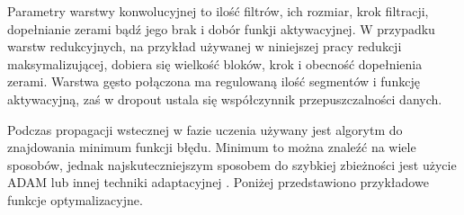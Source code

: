{\parindent0pt %
Parametry warstwy konwolucyjnej to ilość filtrów, ich rozmiar, krok filtracji, dopełnianie zerami bądź jego brak i dobór funkji aktywacyjnej. W przypadku warstw redukcyjnych, na przykład używanej w niniejszej pracy redukcji maksymalizującej, dobiera się wielkość bloków, krok i obecność dopełnienia zerami. Warstwa gęsto połączona ma regulowaną ilość segmentów i funkcję aktywacyjną, zaś w dropout ustala się współczynnik przepuszczalności danych.

Podczas propagacji wstecznej w fazie uczenia używany jest algorytm do znajdowania minimum funkcji błędu. Minimum to można znaleźć na wiele sposobów, jednak najskuteczniejszym sposobem do szybkiej zbieżności jest użycie ADAM lub innej techniki adaptacyjnej \cite{gradient_decent}. Poniżej przedstawiono przykładowe funkcje optymalizacyjne.

}
